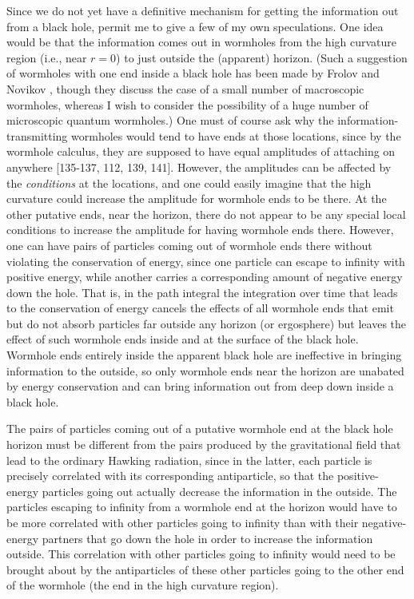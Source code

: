 \documentclass[12pt]{article}
\begin{document}
	    Since we do not yet have a definitive mechanism for
getting the
information out from a black hole, permit me to give a few of my own
speculations.  One idea would be that the information comes out in
wormholes
from the high curvature region (i.e., near $r=0$) to just outside the
(apparent) horizon.
(Such a suggestion of wormholes with one end inside a black hole has
been made by Frolov and Novikov \cite{FroNov}, though they
discuss the case of a small number of macroscopic wormholes,
whereas I wish to consider the possibility of a huge number of
microscopic quantum wormholes.)
One must of course ask why the information-transmitting
wormholes would tend to have ends at those locations, since by the
wormhole
calculus, they are supposed to have equal amplitudes of attaching on
anywhere
[135-137, 112, 139, 141].
However, the amplitudes can be affected by the {\it conditions} at
the
locations, and one could easily imagine that the high curvature could
increase
the amplitude for wormhole ends to be there.  At the other putative
ends, near
the horizon, there do not appear to be any special local conditions
to increase
the amplitude for having wormhole ends there.  However, one can have
pairs of
particles coming out of wormhole ends there without violating the
conservation
of energy, since one particle can escape to infinity with positive
energy,
while another carries a corresponding amount of negative energy down
the hole.
That is, in the path integral the integration over time that leads to
the
conservation of energy cancels the effects of all wormhole ends that
emit
but do not absorb particles far outside any horizon (or ergosphere)
but leaves the effect of such wormhole ends inside and at
the surface of the black hole.  Wormhole ends entirely inside the
apparent
black hole are ineffective in bringing information to the outside, so
only
wormhole ends near the horizon are unabated by energy conservation
and can
bring information out from deep down inside a black hole.

	The pairs of particles coming out of a putative wormhole end
at the black hole
horizon must be different from the pairs produced by the
gravitational field
that lead to the ordinary Hawking radiation, since in the latter,
each particle
is precisely correlated with its corresponding antiparticle, so that
the
positive-energy particles going out actually decrease the information
in the
outside.  The particles escaping to infinity from a wormhole end at
the horizon
would have to be more correlated with other particles going to
infinity than
with their negative-energy partners that go down the hole in order to
increase the information outside.  This correlation with other
particles going
to infinity would need to be brought about by the antiparticles of
these other
particles going to the other end of the wormhole (the end in the high
curvature
region).
\end{document}
